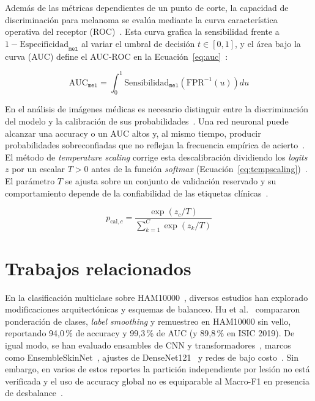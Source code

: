 Además de las métricas dependientes de un punto de corte, la capacidad de discriminación para melanoma se evalúa mediante la curva característica operativa del receptor (ROC)~\cite{maierhein2024metrics}. Esta curva grafica la sensibilidad frente a $1 - \text{Especificidad}_{\texttt{mel}}$ al variar el umbral de decisión $t \in [0, 1]$, y el área bajo la curva (AUC) define el AUC-ROC en la Ecuación~\ref{eq:auc}~\cite{maierhein2024metrics}:

\begin{equation}
  \text{AUC}_{\texttt{mel}} = \int_{0}^{1} \text{Sensibilidad}_{\texttt{mel}}\!\left(\text{FPR}^{-1}(u)\right) du
  \label{eq:auc}
\end{equation}

En el análisis de imágenes médicas es necesario distinguir entre la discriminación del modelo y la calibración de sus probabilidades~\cite{maierhein2024metrics,sambyal2023calibration}. Una red neuronal puede alcanzar una accuracy o un AUC altos y, al mismo tiempo, producir probabilidades sobreconfiadas que no reflejan la frecuencia empírica de acierto~\cite{guo2017calibration,sambyal2023calibration}. El método de \textit{temperature scaling} corrige esta descalibración dividiendo los \textit{logits} $z$ por un escalar $T > 0$ antes de la función \textit{softmax} (Ecuación~\ref{eq:tempscaling})~\cite{guo2017calibration}. El parámetro $T$ se ajusta sobre un conjunto de validación reservado y su comportamiento depende de la confiabilidad de las etiquetas clínicas~\cite{penso2024calibration}.

\begin{equation}
  p_{\text{cal}, c} = \frac{\exp(z_c / T)}{\sum_{k=1}^{C} \exp(z_k / T)}
  \label{eq:tempscaling}
\end{equation}

\section{Trabajos relacionados}

En la clasificación multiclase sobre HAM10000~\cite{tschandl2018ham10000}, diversos estudios han explorado modificaciones arquitectónicas y esquemas de balanceo. Hu et al.~\cite{hu2024multiscale} compararon ponderación de clases, \textit{label smoothing} y remuestreo en HAM10000 sin vello, reportando 94,0\,\% de accuracy y 99,3\,\% de AUC (y 89,8\,\% en ISIC 2019). De igual modo, se han evaluado ensambles de CNN y transformadores~\cite{sariates2025}, marcos como EnsembleSkinNet~\cite{cherukuri2025}, ajustes de DenseNet121~\cite{bello2024densenet} y redes de bajo costo~\cite{almamun2025}. Sin embargo, en varios de estos reportes la partición independiente por lesión no está verificada y el uso de accuracy global no es equiparable al Macro-F1 en presencia de desbalance~\cite{maierhein2024metrics,abhishek2025quality}.

